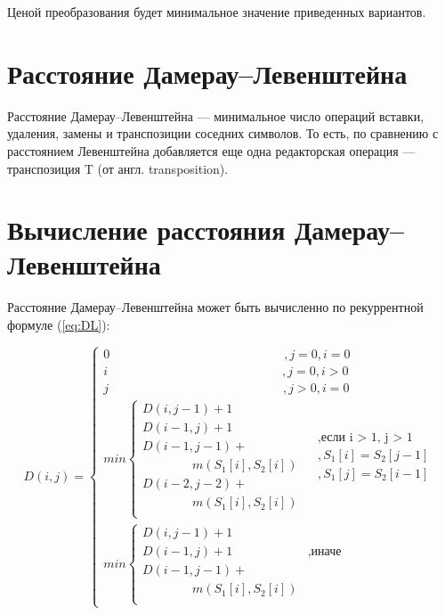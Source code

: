 \documentclass[a4paper,14pt, unknownkeysallowed]{extreport}
\begin{document}
Ценой преобразования будет минимальное значение приведенных вариантов.

\section{Расстояние Дамерау--Левенштейна}

Расстояние Дамерау--Левенштейна --- минимальное число операций вставки, удаления, замены и транспозиции соседних символов. То есть, по сравнению с расстоянием Левенштейна добавляется еще одна редакторская операция — транспозиция T (от англ. transposition).

\section{Вычисление расстояния \newline Дамерау--Левенштейна}

Расстояние Дамерау--Левенштейна может быть вычисленно по рекуррентной формуле (\ref{eq:DL}):

\begin{equation}
	\label{eq:DL}
	D(i, j) = \begin{cases}
	0 \qquad\qquad\qquad\qquad\qquad\qquad\qquad ,j = 0, i = 0\\
	i \qquad\qquad\qquad\qquad\qquad\qquad\qquad ,j = 0, i > 0\\
	j \qquad\qquad\qquad\qquad\qquad\qquad\qquad ,j > 0, i = 0\\
	min \begin{cases}
		D(i, j - 1) + 1\\
		D(i - 1, j) + 1\\
		D(i - 1, j - 1) + \\\qquad\qquad m(S_{1}[i], S_{2}[i])\\
		D(i - 2, j - 2) + \\\qquad\qquad m(S_{1}[i], S_{2}[i]) \\
	\end{cases}
	\begin{aligned}
		& , \text{если i > 1, j > 1} \\
		& , S_{1}[i] = S_{2}[j - 1]  \\
		& , S_{1}[j] =  S_{2}[i - 1] \\
	\end{aligned}\\
	min \begin{cases}
		D(i, j - 1) + 1\\
		D(i - 1, j) + 1 &  \text{,иначе}\\
		D(i - 1, j - 1) + \\\qquad\qquad m(S_{1}[i], S_{2}[i]) \\
	\end{cases}
	\end{cases}
\end{equation}
	    
\end{document}
